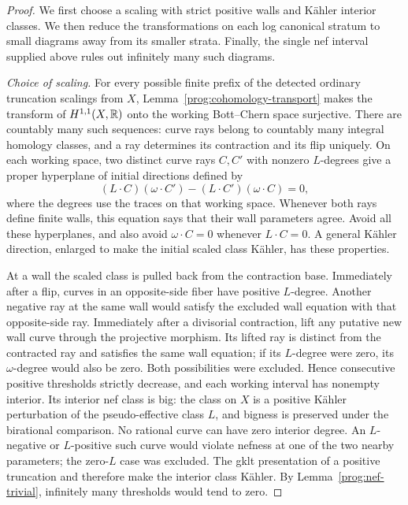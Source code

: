 \begin{proof}
We first choose a scaling with strict positive walls and Kähler interior
classes. We then reduce the transformations on each log canonical stratum
to small diagrams away from its smaller strata. Finally, the single nef
interval supplied above rules out infinitely many such diagrams.

\smallskip\noindent\emph{Choice of scaling.}
For every possible finite prefix of the detected ordinary truncation scalings from \(X\),
Lemma~\ref{prog:cohomology-transport} makes the transform of
\(H^{1,1}(X,\mathbb R)\) onto the working Bott--Chern space
surjective.  There are countably many such sequences: curve
rays belong to countably many integral homology classes, and
a ray determines its contraction and its flip uniquely.
On each working space, two distinct curve rays \(C,C'\) with nonzero
\(L\)-degrees give a proper hyperplane of initial directions defined by
\[
 (L\cdot C)(\omega\cdot C')-(L\cdot C')(\omega\cdot C)=0,
\]
where the degrees use the traces on that working space. Whenever both rays
define finite walls, this equation says that their wall parameters agree.
Avoid all these
hyperplanes, and also avoid \(\omega\cdot C=0\) whenever
\(L\cdot C=0\).  A general Kähler direction, enlarged to
make the initial scaled class Kähler, has these properties.

At a wall the scaled class is pulled back from the contraction
base.  Immediately after a flip, curves in an opposite-side
fiber have positive \(L\)-degree. Another negative ray at
the same wall would satisfy the excluded wall equation with that
opposite-side ray. Immediately after a
divisorial contraction, lift any putative new wall curve
through the projective morphism. Its lifted ray is distinct
from the contracted ray and satisfies the same wall equation; if its
\(L\)-degree were zero, its \(\omega\)-degree would also be
zero.  Both possibilities were excluded.  Hence consecutive
positive thresholds strictly decrease, and each working
interval has nonempty interior.  Its interior nef class is
big: the class on \(X\) is a positive Kähler perturbation of
the pseudo-effective class \(L\), and bigness is preserved
under the birational comparison.  No rational curve can have
zero interior degree.  An \(L\)-negative or \(L\)-positive
such curve would violate nefness at one of the two nearby
parameters; the zero-\(L\) case was excluded.  The gklt
presentation of a positive truncation and
\cite[Theorem~4.3]{HLX} therefore make the interior class
Kähler.  By Lemma~\ref{prog:nef-trivial}, infinitely many
thresholds would tend to zero.


\end{proof}

